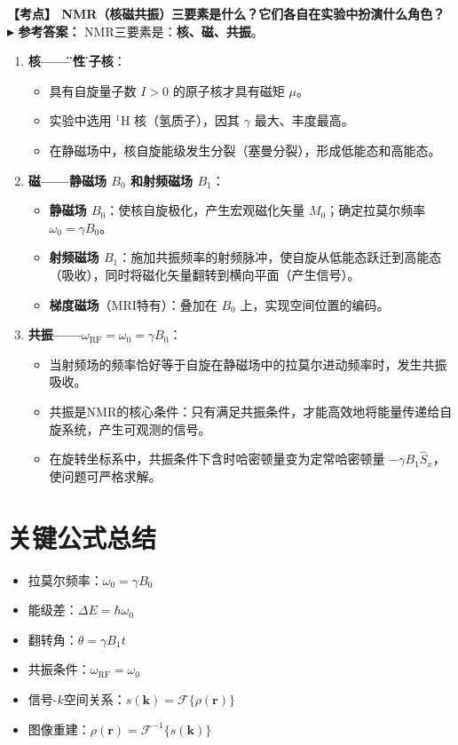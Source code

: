 \documentclass[12pt,a4paper]{article}
\newcommand{\hl}[1]{\textbf{\color{red}#1}}
\newcommand{\exam}[1]{\textbf{\color{blue!70!black}【考点】#1}}
\newcommand{\answer}[1]{\vspace{2pt}\noindent\textbf{\color{teal!80!black}▸ 参考答案：}#1\vspace{4pt}}
\newcommand{\qa}[2]{\exam{#1}\answer{#2}}
\begin{document}
\qa{
    NMR（核磁共振）三要素是什么？它们各自在实验中扮演什么角色？
}{
    NMR三要素是：\hl{核、磁、共振}。

    \begin{enumerate}
        \item \textbf{核——\"磁性\"原子核}：
        \begin{itemize}
            \item 具有自旋量子数 $I>0$ 的原子核才具有磁矩 $\mu$。
            \item 实验中选用 $^1$H 核（氢质子），因其 $\gamma$ 最大、丰度最高。
            \item 在静磁场中，核自旋能级发生分裂（塞曼分裂），形成低能态和高能态。
        \end{itemize}
        \item \textbf{磁——静磁场 $B_0$ 和射频磁场 $B_1$}：
        \begin{itemize}
            \item \textbf{静磁场 $B_0$}：使核自旋极化，产生宏观磁化矢量 $M_0$；确定拉莫尔频率 $\omega_0 = \gamma B_0$。
            \item \textbf{射频磁场 $B_1$}：施加共振频率的射频脉冲，使自旋从低能态跃迁到高能态（吸收），同时将磁化矢量翻转到横向平面（产生信号）。
            \item \textbf{梯度磁场}（MRI特有）：叠加在 $B_0$ 上，实现空间位置的编码。
        \end{itemize}
        \item \textbf{共振——$\omega_{\text{RF}} = \omega_0 = \gamma B_0$}：
        \begin{itemize}
            \item 当射频场的频率恰好等于自旋在静磁场中的拉莫尔进动频率时，发生共振吸收。
            \item 共振是NMR的核心条件：只有满足共振条件，才能高效地将能量传递给自旋系统，产生可观测的信号。
            \item 在旋转坐标系中，共振条件下含时哈密顿量变为定常哈密顿量 $-\gamma B_1\hat{S}_x$，使问题可严格求解。
        \end{itemize}
    \end{enumerate}
}

\section{关键公式总结}
\begin{itemize}
    \item 拉莫尔频率：\(\omega_0 = \gamma B_0\)
    \item 能级差：\(\Delta E = \hbar\omega_0\)
    \item 翻转角：\(\theta = \gamma B_1 t\)
    \item 共振条件：\(\omega_{\text{RF}} = \omega_0\)
    \item 信号-\(k\)空间关系：\(s(\mathbf{k}) = \mathcal{F}\{\rho(\mathbf{r})\}\)
    \item 图像重建：\(\rho(\mathbf{r}) = \mathcal{F}^{-1}\{s(\mathbf{k})\}\)
\end{itemize}
\end{document}

